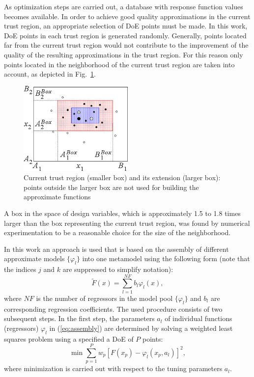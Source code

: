\documentclass[runningheads,a4paper]{llncs}
\begin{document}
As optimization steps are carried out, a database with response function values becomes available. In order to achieve good quality approximations in the current trust region, an appropriate selection of DoE points must be made. In this work, DoE points in each trust region is generated randomly. Generally, points located far from the current trust region would not contribute to the improvement of the quality of the resulting approximations in the trust region. For this reason only points located in the neighborhood of the current trust region are taken into account, as depicted in Fig.~\ref{fig:trustregion}.
\begin{figure}[ht]
    \centering
    \includegraphics[width=0.5\textwidth]{trustregion.png}
    \caption{Current trust region (smaller box) and its extension (larger box): points outside the larger box are not used for building the approximate functions}
    \label{fig:trustregion}
\end{figure}
A box in the space of design variables, which is approximately 1.5 to 1.8 times larger than the box representing the current trust region, was found by numerical experimentation to be a reasonable choice for the size of the neighborhood.

In this work an approach is used that is based on the assembly of different approximate models $\{\varphi_l\}$ into one metamodel using the following form (note that the indices $j$ and $k$ are suppressed to simplify notation):
\begin{equation}\label{eq:assembly}
\widetilde{F}(x) = \sum_{l=1}^{NF}{b_l\varphi_l(x)},
\end{equation}
where $NF$ is the number of regressors in the model pool $\{\varphi_l\}$ and $b_l$ are corresponding regression coefficients.
The used procedure consists of two subsequent steps. In the first step, the parameters $a_l$ of individual functions (regressors) $\varphi_l$ in (\ref{eq:assembly}) are determined by solving a weighted least squares problem using a specified a DoE of $P$ points:
\[
\min \sum_{p=1}^P{w_{p}\left[ F(x_p)- \varphi_l(x_p,a_l) \right]^2},
\]
where minimization is carried out with respect to the tuning parameters $a_l$.
\end{document}
